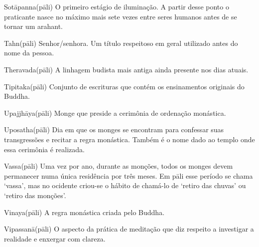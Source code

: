 \begin{glossarydescription}
\item[{{Sotāpanna}{(pāli)}}] O primeiro estágio de iluminação. A partir desse ponto o praticante nasce no máximo mais sete vezes entre seres humanos antes de se tornar um arahant.

\item[{{Tahn}{(pāli)}}] Senhor/senhora. Um título respeitoso em geral utilizado antes do nome da pessoa.

\item[{{Theravada}{(pāli)}}] A linhagem budista mais antiga ainda presente nos dias atuais.

\item[{{Tipitaka}{(pāli)}}] Conjunto de escrituras que contém os ensinamentos originais do Buddha.

\item[{{Upajjhāya}{(pāli)}}] Monge que preside a cerimônia de ordenação monástica.

\item[{{Uposatha}{(pāli)}}] Dia em que os monges se encontram para confessar suas transgressões e recitar a regra monástica. Também é o nome dado ao templo onde essa cerimônia é realizada.

\item[{{Vassa}{(pāli)}}] Uma vez por ano, durante as monções, todos os monges devem permanecer numa única residência por três meses. Em pāli esse período se chama `vassa', mas no ocidente criou-se o hábito de chamá-lo de `retiro das chuvas' ou `retiro das monções'.

\item[{{Vinaya}{(pāli)}}] A regra monástica criada pelo Buddha.

\item[{{Vipassanā}{(pāli)}}] O aspecto da prática de meditação que diz respeito a investigar a realidade e enxergar com clareza.

\end{glossarydescription}

